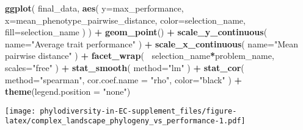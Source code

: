 \documentclass[]{book}
\newenvironment{Shaded}{\begin{snugshade}}{\end{snugshade}}
\newcommand{\DataTypeTok}[1]{\textcolor[rgb]{0.13,0.29,0.53}{#1}}
\newcommand{\KeywordTok}[1]{\textcolor[rgb]{0.13,0.29,0.53}{\textbf{#1}}}
\newcommand{\NormalTok}[1]{#1}
\newcommand{\OperatorTok}[1]{\textcolor[rgb]{0.81,0.36,0.00}{\textbf{#1}}}
\newcommand{\StringTok}[1]{\textcolor[rgb]{0.31,0.60,0.02}{#1}}
\begin{document}
\begin{Shaded}
\begin{Highlighting}[]
\KeywordTok{ggplot}\NormalTok{(}
\NormalTok{    final_data,}
    \KeywordTok{aes}\NormalTok{(}
        \DataTypeTok{y=}\NormalTok{max_performance,}
        \DataTypeTok{x=}\NormalTok{mean_phenotype_pairwise_distance,}
        \DataTypeTok{color=}\NormalTok{selection_name,}
        \DataTypeTok{fill=}\NormalTok{selection_name}
\NormalTok{    )}
\NormalTok{  ) }\OperatorTok{+}
\StringTok{  }\KeywordTok{geom_point}\NormalTok{() }\OperatorTok{+}
\StringTok{    }\KeywordTok{scale_y_continuous}\NormalTok{(}
        \DataTypeTok{name=}\StringTok{"Average trait performance"}
\NormalTok{  ) }\OperatorTok{+}
\StringTok{  }\KeywordTok{scale_x_continuous}\NormalTok{(}
        \DataTypeTok{name=}\StringTok{"Mean pairwise distance"}
\NormalTok{  ) }\OperatorTok{+}\StringTok{ }
\StringTok{  }\KeywordTok{facet_wrap}\NormalTok{(}
      \OperatorTok{~}\NormalTok{selection_name}\OperatorTok{*}\NormalTok{problem_name, }\DataTypeTok{scales=}\StringTok{"free"}
\NormalTok{  ) }\OperatorTok{+}\StringTok{ }
\StringTok{  }\KeywordTok{stat_smooth}\NormalTok{(}
    \DataTypeTok{method=}\StringTok{"lm"}
\NormalTok{  ) }\OperatorTok{+}\StringTok{ }
\StringTok{  }\KeywordTok{stat_cor}\NormalTok{(}
    \DataTypeTok{method=}\StringTok{"spearman"}\NormalTok{, }\DataTypeTok{cor.coef.name =} \StringTok{"rho"}\NormalTok{, }\DataTypeTok{color=}\StringTok{"black"}
\NormalTok{  ) }\OperatorTok{+}
\StringTok{  }\KeywordTok{theme}\NormalTok{(}\DataTypeTok{legend.position =} \StringTok{"none"}\NormalTok{)}
\end{Highlighting}
\end{Shaded}

\texttt{[image: phylodiversity-in-EC-supplement\_files/figure-latex/complex\_landscape\_phylogeny\_vs\_performance-1.pdf]}
\end{document}
